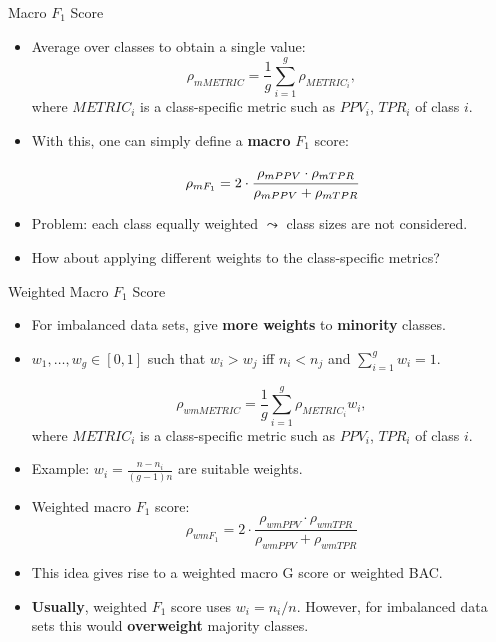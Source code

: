 \documentclass[10pt,compress,t,notes=noshow, xcolor=table]{beamer}
\begin{document}
\begin{frame}{Macro $F_1$ Score}
	
	\small{

    	\begin{itemize}
    
    		\item Average over classes to obtain a single value:
            $$\rho_{mMETRIC} = \frac{1}{g}\sum_{i=1}^g \rho_{METRIC_i},$$
            where $METRIC_i$ is a class-specific metric such as $PPV_i$, $TPR_i$ of class $i$.
    		
    	
    		\item With this, one can simply define a \textbf{macro} $F_1$ score:
    	
    		$$\rho_{mF_1} = 2 \cdot \cfrac{\rho_{mPPV} \cdot \rho_{mTPR}}{\rho_{mPPV} + 
    			\rho_{mTPR}}$$
    
    		\item Problem: each class equally weighted $\leadsto$ class sizes are not considered.
    
            \item How about applying different weights to the class-specific metrics?

    	\end{itemize}
	}
\end{frame}

\begin{frame}{Weighted Macro $F_1$ Score}

	\small{

    	\begin{itemize}
    
    		\item For imbalanced data sets, give \textbf{more weights} to \textbf{minority} classes.
      
            \item $w_1,\ldots,w_g \in[0,1]$  such that $w_i > w_j$ iff $n_i < n_j$ and $\sum_{i=1}^g w_i = 1.$
    
            $$\rho_{wmMETRIC} = \frac{1}{g}\sum_{i=1}^g \rho_{METRIC_i} w_i,$$
            where $METRIC_i$ is a class-specific metric such as $PPV_i$, $TPR_i$ of class $i$.
    	 
    		\item Example: $w_i = \frac{n - n_i}{(g-1)n}$ are suitable weights.
    
    		\item Weighted macro $F_1$ score:	
    		$$\rho_{wmF_1} = 2 \cdot \frac{\rho_{wmPPV} \cdot \rho_{wmTPR}}{\rho_{wmPPV} + \rho_{wmTPR}}$$
      
    		\item This idea gives rise to a weighted macro G score or weighted BAC.
    	
    		\item \textbf{Usually}, weighted $F_1$ score uses $w_i = n_i/n$. However, for imbalanced data sets this would \textbf{overweight} majority classes.
    
    	\end{itemize}
	}
\end{frame}
\end{document}
